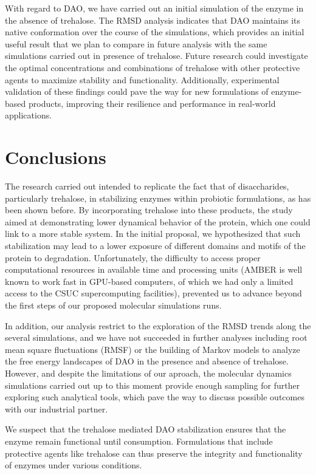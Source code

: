 \documentclass[12pt,twoside]{article}
\begin{document}
With regard to DAO, we have carried out an initial simulation of the enzyme  in the absence of trehalose. The RMSD analysis indicates that DAO maintains its native conformation over the course of the simulations, which provides an initial useful result that we plan to compare in future analysis with the same simulations carried out in presence of trehalose. Future research could investigate the optimal concentrations and combinations of trehalose with other protective agents to maximize stability and functionality. Additionally, experimental validation of these findings could pave the way for new formulations of enzyme-based products, improving their resilience and performance in real-world applications.

\clearpage
\section{Conclusions}

The research carried out intended to replicate the fact that of disaccharides, particularly trehalose, in stabilizing enzymes within probiotic formulations, as has been shown before\cite{shao_trehalose_2019}. By incorporating trehalose into these products, the study aimed at demonstrating lower dynamical behavior of the protein, which one could link to a more stable system. In the initial proposal, we hypothesized that such stabilization may lead to a lower exposure of different domains and motifs of the protein to degradation. Unfortunately, the difficulty to access proper computational resources in available time and processing units (AMBER is well known to work fast in GPU-based computers, of which we had only a limited access to the CSUC supercomputing facilities), prevented us to advance beyond the first steps of our proposed molecular simulations runs. 

In addition, our analysis restrict to the exploration of the RMSD trends along the several simulations, and we have not succeeded in further analyses including root mean square fluctuations (RMSF) or the building of Markov models to analyze the free energy landscapes of DAO in the presence and absence of trehalose. However, and despite the limitations of our aproach, the molecular dynamics simulations carried out up to this moment provide enough sampling for further exploring such analytical tools, which pave the way to discuss possible outcomes with our industrial partner.

We suspect that the trehalose mediated DAO stabilization ensures that the enzyme remain functional until consumption. Formulations that include protective agents like trehalose can thus preserve the integrity and functionality of enzymes under various conditions.
\end{document}

